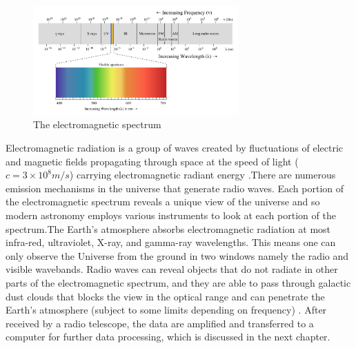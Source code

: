 \begin{figure}[h!]
  \centering
    \includegraphics[width=0.7\textwidth]{images/Electromagnetic-Spectrum.png}
    \caption{The electromagnetic spectrum \citep{ElectromagneticSpectrum}}
  \label{images/Electromagnetic-Spectrum.png}
\end{figure}

Electromagnetic radiation is a group of waves created by fluctuations of electric and magnetic fields propagating through space at the speed of light ($c=3\times 10^{8} m/s$) carrying electromagnetic radiant energy \citep{ElectromagneticSpectrum}.\;There are numerous emission mechanisms in the universe that generate radio waves.
Each portion of the electromagnetic spectrum reveals a unique view of the universe and so modern astronomy employs various instruments to look at each portion of the spectrum.\;The Earth's atmosphere absorbs electromagnetic radiation at most infra-red, ultraviolet, X-ray, and gamma-ray wavelengths. This means one can only observe the Universe from the ground in two windows namely the radio and visible wavebands. Radio waves can reveal objects that do not radiate in other parts of the electromagnetic spectrum, and they are able to pass through galactic dust clouds that blocks the view in the optical range and can penetrate the Earth's atmosphere (subject to some limits depending on frequency) \citep{thompson2001interferometry}. After received by a radio telescope, the data are amplified and transferred to a computer for further  data processing, which is discussed in the next chapter.


